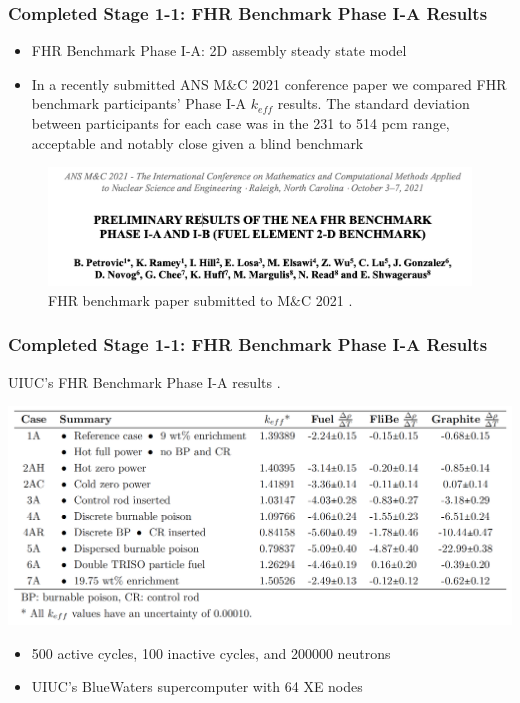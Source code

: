 \begin{frame}
    \frametitle{Completed Stage 1-1: FHR Benchmark Phase I-A Results}
    \begin{itemize}
        \item FHR Benchmark Phase I-A: 2D assembly steady state model
        \item In a recently submitted ANS M$\&$C 2021 conference paper 
        we compared FHR benchmark participants' Phase I-A $k_{eff}$ results.  
        The standard deviation between participants for each case 
        was in the 231 to 514 pcm range, acceptable and notably close given a blind 
        benchmark
    \end{itemize}

    \begin{figure}[]
        \centering
        \includegraphics[width=0.85\linewidth]{figures/mnc.png} 
        \caption{FHR benchmark paper submitted to M$\&$C 2021 \cite{petrovic_preliminary_2021}.}
    \end{figure}
\end{frame}

\begin{frame}
    \frametitle{Completed Stage 1-1: FHR Benchmark Phase I-A Results}
    \begin{table}
        \caption{UIUC's FHR Benchmark Phase I-A results 
        \cite{chee_arfcfhr-benchmark_2021}.}
        \includegraphics[width=\linewidth]{figures/benchmark-coeff-results.png} 
    \end{table}
    \begin{itemize}
        \item 500 active cycles, 100 inactive cycles, and 200000 neutrons
        \item UIUC's BlueWaters supercomputer with 64 XE nodes
    \end{itemize}
\end{frame}

